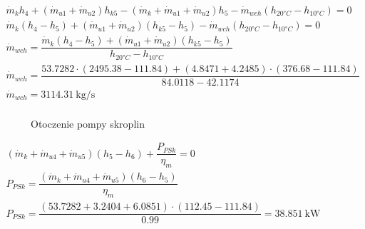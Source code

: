 \renewcommand{\arraystretch}{1.5}
\begin{math}
	\begin{array}{l}
		\dot m_k h_4 + (\dot m_{u1} + \dot m_{u2}) h_{k5}
			- (\dot m_k + \dot m_{u1} + \dot m_{u2}) h_5
			- \dot m_{wch} (h_{20°C} - h_{10°C}) = 0 \\
		\dot m_k (h_4 - h_5) + (\dot m_{u1} + \dot m_{u2}) (h_{k5} - h_5)
			- \dot m_{wch} (h_{20°C} - h_{10°C}) = 0 \\

		\dot m_{wch} = \dfrac{\dot m_k (h_4 - h_5)
			+ (\dot m_{u1} + \dot m_{u2})(h_{k5} - h_5)
			}{h_{20°C} - h_{10°C}} \\
		\dot m_{wch} = \dfrac{\num{53,7282} \cdot (\num{2495,38} - \num{111,84})
				+ (\num{4,8471} + \num{4,2485}) \cdot (\num{376,68} - \num{111,84})
				}{\num{84,0118} - \num{42,1174}} \\
		\dot m_{wch} = \SI{3114,31}{\kilogram\per\second} \\
	\end{array}
\end{math}

\begin{figure}[H]
	\centering

	\caption{Otoczenie pompy skroplin}
\end{figure}

\begin{math}
	\begin{array}{l}
		(\dot m_k + \dot m_{u4} + \dot m_{u5})(h_5 - h_6)
			+ \dfrac{P_{PSk}}{\eta_m} = 0 \\
		P_{PSk} = \dfrac{(\dot m_k + \dot m_{u4} + \dot m_{u5})(h_6 - h_5)
			}{\eta_m} \\
		P_{PSk} = \dfrac{(\num{53,7282} + \num{3,2404} + \num{6,0851})
				\cdot (\num{112,45} - \num{111,84})
			}{\num{0,99}}
			= \SI{38,851}{\kilo\watt} \\
	\end{array}
\end{math}

